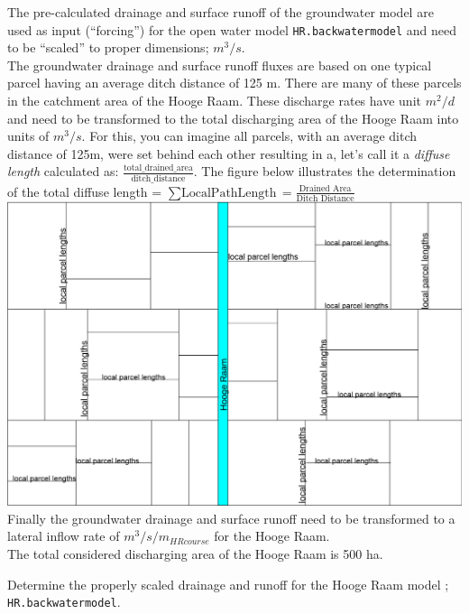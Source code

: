 \documentclass[
]{article}
\begin{document}
The pre-calculated drainage and surface runoff of the groundwater model
are used as input (``forcing'') for the open water model
\texttt{HR.backwatermodel} and need to be ``scaled'' to proper
dimensions; \(m^3/s\).\\
The groundwater drainage and surface runoff fluxes are based on one
typical parcel having an average ditch distance of 125 m. There are many
of these parcels in the catchment area of the Hooge Raam. These
discharge rates have unit \(m^2/d\) and need to be transformed to the
total discharging area of the Hooge Raam into units of \(m^3/s\). For
this, you can imagine all parcels, with an average ditch distance of
125m, were set behind each other resulting in a, let's call it a
\emph{diffuse length} calculated as:
\(\frac {\text{total_drained_area}}{\text{ditch_distance}}\). The figure
below illustrates the determination of the total diffuse length =
\({\sum\text{LocalPathLength}}=\frac{\text{Drained Area}}{\text{Ditch Distance}}\)\\
\includegraphics{Hooge_raam_diffuse_length.png}\\
Finally the groundwater drainage and surface runoff need to be
transformed to a lateral inflow rate of \(m^3/s/m_{HRcourse}\) for the
Hooge Raam.\\
The total considered discharging area of the Hooge Raam is 500 ha.

Determine the properly scaled drainage and runoff for the Hooge Raam
model ; \texttt{HR.backwatermodel}.
\end{document}
